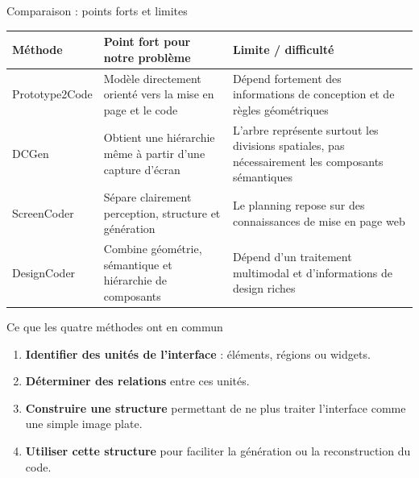 \documentclass[aspectratio=169,11pt]{beamer}
\begin{document}
\begin{frame}{Comparaison : points forts et limites}
\scriptsize
\begin{tabularx}{\textwidth}{>{\raggedright\arraybackslash}p{2.4cm} X X}
\toprule
\textbf{Méthode} & \textbf{Point fort pour notre problème} & \textbf{Limite / difficulté}\\
\midrule
Prototype2Code &
Modèle directement orienté vers la mise en page et le code &
Dépend fortement des informations de conception et de règles géométriques\\
DCGen &
Obtient une hiérarchie même à partir d'une capture d'écran &
L'arbre représente surtout les divisions spatiales, pas nécessairement les composants sémantiques\\
ScreenCoder &
Sépare clairement perception, structure et génération &
Le planning repose sur des connaissances de mise en page web\\
DesignCoder &
Combine géométrie, sémantique et hiérarchie de composants &
Dépend d'un traitement multimodal et d'informations de design riches\\
\bottomrule
\end{tabularx}
\end{frame}

\begin{frame}{Ce que les quatre méthodes ont en commun}
\begin{enumerate}
  \item \textbf{Identifier des unités de l'interface} : éléments, régions ou widgets.
  \item \textbf{Déterminer des relations} entre ces unités.
  \item \textbf{Construire une structure} permettant de ne plus traiter l'interface comme une simple image plate.
  \item \textbf{Utiliser cette structure} pour faciliter la génération ou la reconstruction du code.
\end{enumerate}

\vspace{0.35cm}
\centering
{}
\end{frame}
\end{document}
